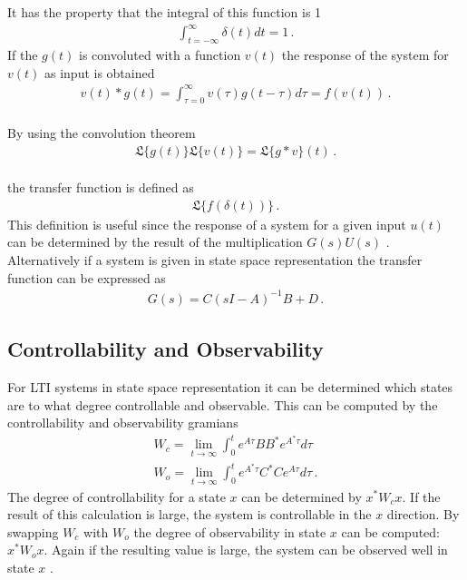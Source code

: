 It has the property that the integral of this function is 1
\begin{gather}
\int_{t = -\infty}^{\infty} \delta(t) dt = 1 \,.
\end{gather}
If the \(g(t)\) is convoluted with a function \(v(t)\) the response of the system for \(v(t)\) as input is obtained \cite{DouglasBb}
\begin{gather}
v(t)*g(t) = \int_{\tau = 0}^{\infty} v(\tau)g(t-\tau)d\tau = f(v(t)) \,.
\end{gather}
 \\
By using the convolution theorem \cite{ABELL2018399}
\begin{gather}
\mathfrak{L}\{g(t)\}\mathfrak{L}\{v(t)\} = \mathfrak{L}\{g*v\}(t) \,.
\end{gather}
\\
the transfer function is defined as
\begin{gather}
\mathfrak{L}\{f(\delta(t))\} \,.
\end{gather}
This definition is useful since the response of a system for a given input \(u(t)\) can be determined by the result of the multiplication \(G(s)U(s)\) \cite{DouglasBb}.
Alternatively if a system is given in state space representation the transfer function can be expressed as
\begin{gather}
G(s) = C(sI-A)^{-1}B+D \,. \label{tf-from-ss}
\end{gather}
\cite{BennerGrivet}

\subsection{Controllability and Observability}
For LTI systems in state space representation it can be determined which states are to what degree controllable and observable.
This can be computed by the controllability and observability gramians
\begin{gather}
W_c = \lim_{t \to \infty} \int_{0}^{t} e^{A\tau}BB^{*}e^{A^{*}\tau}d\tau \label{gram-ctrl}\\
W_o = \lim_{t \to \infty} \int_{0}^{t} e^{A^{*}\tau}C^{*}Ce^{A\tau}d\tau \,. \label{gram-obsv}
\end{gather}
The degree of controllability for a state \(x\) can be determined by \(x^{*}W_cx\).
If the result of this calculation is large, the system is controllable in the \(x\) direction.
By swapping \(W_c\) with \(W_o\) the degree of observability in state \(x\) can be computed: \(x^{*}W_ox\).
Again if the resulting value is large, the system can be observed well in state \(x\) \cite{brunton_kutz_2019d}.
